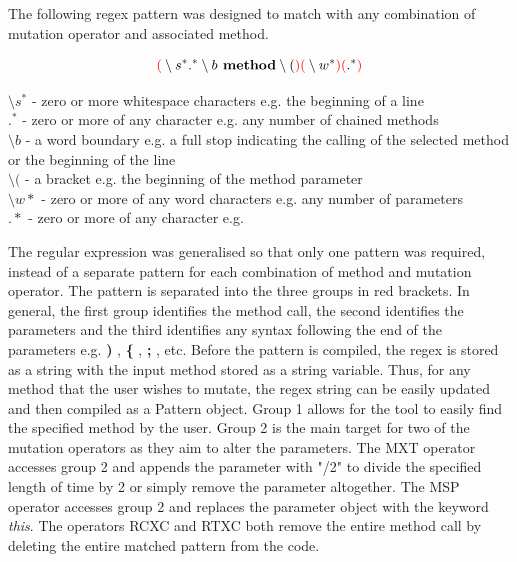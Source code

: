 \documentclass[a4paper,12pt]{article}
\begin{document}
The following regex pattern was designed to match with any combination of mutation operator and associated method.

\begin{equation}
    \textbf{$\color{red}($}\setminus s^*.^*\setminus b \textbf{ method} \setminus (\textbf{$\color{red})($}\setminus w^*\textbf{$\color{red})($}.^*\textbf{$\color{red})$}    
\end{equation}

\noindent$ \setminus s^* $ - zero or more whitespace characters e.g. the beginning of a line
\\$ .^* $ - zero or more of any character e.g. any number of chained methods
\\$\setminus b$ - a word boundary e.g. a full stop indicating the calling of the selected method or the beginning of the line
\\$\setminus ($ - a bracket e.g. the beginning of the method parameter
\\$\setminus w*$ - zero or more of any word characters e.g. any number of parameters
\\$.*$ - zero or more of any character e.g.

The regular expression was generalised so that only one pattern was required, instead of a separate pattern for each combination of method and mutation operator. The pattern is separated into the three groups in red brackets. In general, the first group identifies the method call, the second identifies the parameters and the third identifies any syntax following the end of the parameters e.g. \textbf{)} , \textbf{\{} , \textbf{;} , etc. Before the pattern is compiled, the regex is stored as a string with the input method stored as a string variable. Thus, for any method that the user wishes to mutate, the regex string can be easily updated and then compiled as a Pattern object. Group 1 allows for the tool to easily find the specified method by the user. Group 2 is the main target for two of the mutation operators as they aim to alter the parameters. The MXT operator accesses group 2 and appends the parameter with "/2" to divide the specified length of time by 2 or simply remove the parameter altogether. The MSP operator accesses group 2 and replaces the parameter object with the keyword \textit{this}. The operators RCXC and RTXC both remove the entire method call by deleting the entire matched pattern from the code.       
\end{document}
